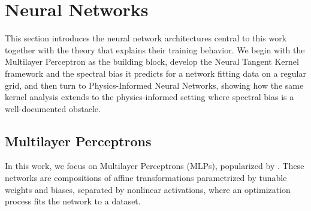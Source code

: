 \section{Neural Networks}
\label{sec:neural_networks}

This section introduces the neural network architectures central to this work together with the theory that explains their training behavior. We begin with the Multilayer Perceptron as the building block, develop the Neural Tangent Kernel framework and the spectral bias it predicts for a network fitting data on a regular grid, and then turn to Physics-Informed Neural Networks, showing how the same kernel analysis extends to the physics-informed setting where spectral bias is a well-documented obstacle.

\subsection{Multilayer Perceptrons}
\label{subsec:mlp}

In this work, we focus on Multilayer Perceptrons (MLPs), popularized by \textcite{rumelhart1986}. These networks are compositions of affine transformations parametrized by tunable weights and biases, separated by nonlinear activations, where an optimization process fits the network to a dataset.

